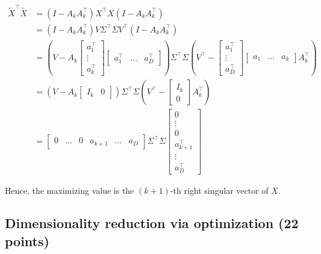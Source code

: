 \documentclass[a4paper]{article}
\theoremstyle{definition}
\newenvironment{soln}{
    \leavevmode\color{blue}\ignorespaces
}{}
\begin{document}
\begin{enumerate}
\begin{soln}
    \begin{align*}
        \tilde{X}^\top \tilde{X} &= (I - A_k A_k^\top) X^\top X (I - A_k A_k^\top) \\
        &= (I - A_k A_k^\top) V \Sigma^\top \Sigma V^\top (I - A_k A_k^\top) \\
        &= \left(V - A_k \begin{bmatrix} a_1^\top \\ \vdots \\ a_k^\top \end{bmatrix} \begin{bmatrix} a_1^\top & \ldots & a_D^\top \end{bmatrix}\right) \Sigma^\top \Sigma \left( V^\top - \begin{bmatrix} a_1^\top \\ \vdots \\ a_D^\top \end{bmatrix} \begin{bmatrix} a_1 & \ldots & a_k \end{bmatrix} A_k^\top \right) \\
        &= (V - A_k \begin{bmatrix} I_k &  0 \end{bmatrix}) \Sigma^\top \Sigma (V^\top - \begin{bmatrix} I_k \\ 0 \end{bmatrix} A_k^\top) \\
        &= \begin{bmatrix} 0 & \ldots & 0 & a_{k+1} & \ldots & a_D \end{bmatrix} \Sigma^\top \Sigma \begin{bmatrix} 0 \\ \vdots \\ 0 \\ a_{k+1}^\top \\ \vdots \\ a_D^\top \end{bmatrix}
    \end{align*}

    Hence, the maximizing value is the $(k+1)$-th right singular vector of $X$.
\end{soln}

\end{enumerate}


\subsection{Dimensionality reduction via optimization (22 points)}
\end{document}
